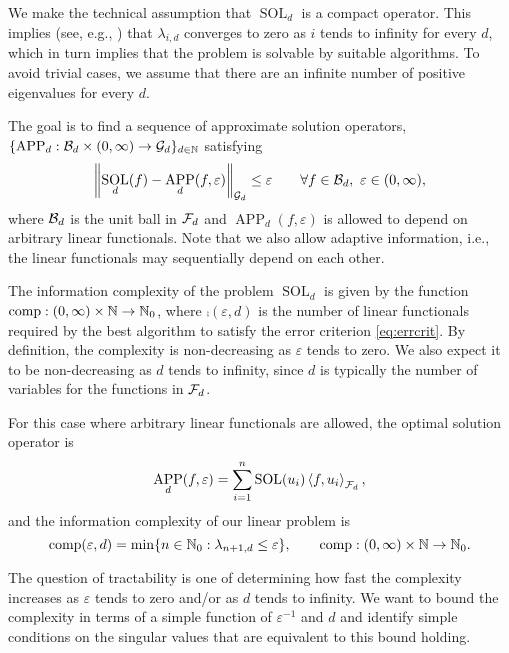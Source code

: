 \documentclass[11pt,a4paper]{article}
\DeclareMathOperator{\SOL}{SOL}
\DeclareMathOperator{\APP}{APP}
\begin{document}
We make the technical assumption that $\SOL_d$ is a compact operator. This implies (see, e.g., \cite{NW08}) that $\lambda_{i,d}$ converges to zero as $i$ tends to infinity for every $d$, which in turn implies that the problem is solvable by suitable algorithms. To avoid trivial cases, we assume that there are an infinite number of positive eigenvalues for every $d$.

The goal is to find a sequence of approximate solution operators, $\{\APP_d:\cb_d \times (0,\infty) \to \cg_d\}_{d \in \naturals}$ satisfying
\begin{equation}
    \label{eq:errcrit}
    \norm[\cg_d]{\SOL_d(f) - \APP_d(f,\varepsilon)} \le \varepsilon \qquad \forall f \in \cb_d, \ \varepsilon \in (0,\infty),
\end{equation}
where $\mathcal{B}_d$ is the unit ball in $\mathcal{F}_d$ and $\APP_d(f,\varepsilon)$ is allowed to depend on arbitrary linear functionals.  Note that we also allow adaptive information, i.e., the linear functionals may sequentially depend on each other.

The information complexity of the problem $\SOL_d$ is given by the function $\operatorname{comp}:(0,\infty) \times \mathbb{N} \to \mathbb{N}_{0}$, where $\comp(\varepsilon,d)$ is the number of linear functionals required by the best algorithm to satisfy the error criterion \eqref{eq:errcrit}.
By definition, the complexity is non-decreasing  as $\varepsilon$ tends to zero.  We also expect it to be non-decreasing as $d$ tends to infinity, since $d$ is typically the number of variables for the functions in $\mathcal{F}_d$.

For this case where arbitrary linear functionals are allowed, the optimal solution operator is
\[
\APP_d(f,\varepsilon) = \sum_{i=1}^n \SOL(u_i) \ip[\cf_d]{f}{u_i},
\]
and the information complexity of our linear problem is
\begin{equation}\label{eq:comp_def}
\operatorname{comp}(\varepsilon, d) = \min \{n \in \mathbb{N}_{0} : \lambda_{n+1, d} \le \varepsilon\}, \qquad \operatorname{comp}:(0,\infty) \times \mathbb{N} \to \mathbb{N}_{0}.
\end{equation}


The question of tractability is one of determining how fast the complexity increases as $\varepsilon$ tends to zero and/or as $d$ tends to infinity.  We want to bound the complexity in terms of a simple function of $\varepsilon^{-1}$ and $d$ and identify simple conditions on the singular values that are equivalent to this bound holding. 
\end{document}
